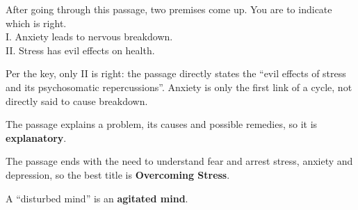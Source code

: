After going through this passage, two premises come up. You are to indicate which is right.\\
I. Anxiety leads to nervous breakdown.\\ II. Stress has evil effects on health.

Per the key, only II is right: the passage directly states the ``evil effects of stress and its psychosomatic repercussions''. Anxiety is only the first link of a cycle, not directly said to cause breakdown.

The passage explains a problem, its causes and possible remedies, so it is \textbf{explanatory}.

The passage ends with the need to understand fear and arrest stress, anxiety and depression, so the best title is \textbf{Overcoming Stress}.

A ``disturbed mind'' is an \textbf{agitated mind}.
